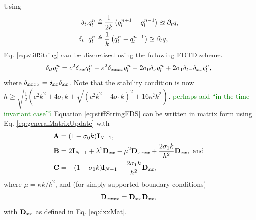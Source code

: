 \documentclass[fleqn]{jaes}
\def\MDcomment[#1]{\textcolor{green}{#1}}
\begin{document}
Using
\begin{subequations}
\begin{align}
    \delta_{t\cdot} q_l^n &\triangleq \frac{1}{2k}\left(q_l^{n+1} - q_l^{n-1}\right) \approxeq \partial_t q ,\\
     \delta_{t-} q_l^n &\triangleq \frac{1}{k}\left(q_l^n- q_l^{n-1}\right) \approxeq  \partial_t q,
\end{align}
\end{subequations}
Eq. \eqref{eq:stiffString} can be discretised using the following FDTD scheme:
\begin{equation}\label{eq:stiffStringFDS}
    \dtt \qln = c^2 \dxx \qln - \kappa^2 \dxxxx \qln - 2\sigma_0\dtd \qln + 2 \sigma_1 \dtm \dxx \qln,
\end{equation}
where $\delta_{xxxx} = \delta_{xx}\delta_{xx}$. Note that the stability condition is now $h\! \geq\! \sqrt{\tfrac{1}{2}(c^2k^2 + 4\sigma_1 k + \sqrt{(c^2k^2 + 4\sigma_1k)^2 +16\kappa^2k^2})}.$  \MDcomment[perhaps add ``in the time-invariant case''?]
Equation \eqref{eq:stiffStringFDS} can be written in matrix form using Eq. \eqref{eq:generalMatrixUpdate} with 
\begin{equation}\label{eq:stiffStringMats}
\begin{aligned}
    \A &= (1 + \sigma_0k)\I_{N-1},\\ \B &= 2\I_{N-1} + \lambda^2 \Dxx - \mu^2 \Dxxxx + \frac{2\sigma_1k}{h^2}\Dxx, \  \text{and}\\
    \C &= -(1 - \sigma_0k)\I_{N-1} - \frac{2\sigma_1k}{h^2}\Dxx,
\end{aligned}
\end{equation}
where $\mu = \kappa k/h^2$, and (for simply supported boundary conditions)
\begin{equation}\label{eq:DxxxxMat}
    \Dxxxx = \Dxx\Dxx,
\end{equation}
with $\mathbf{D}_{xx}$ as defined in Eq. \eqref{eq:dxxMat}.
\end{document}

